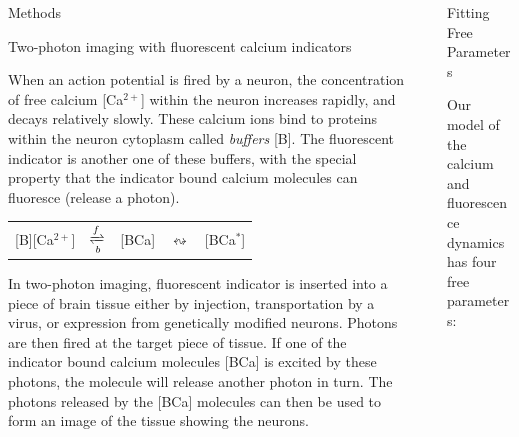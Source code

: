 \documentclass[final]{beamer}
\newlength{\sepwid}
\newlength{\onecolwid}
\begin{document}
\begin{frame}[t]
\begin{columns}[t]
\begin{column}{\onecolwid}
\begin{block}{Methods}
\begin{alertblock}{Two-photon imaging with fluorescent calcium indicators}

When an action potential is fired by a neuron, the concentration of free calcium [Ca$^{2+}$] within the neuron increases rapidly, and decays relatively slowly. These calcium ions bind to proteins within the neuron cytoplasm called \textit{buffers} [B]. The fluorescent indicator is another one of these buffers, with the special property that the indicator bound calcium molecules can fluoresce (release a photon).

\begin{center}
	\begin{tabular}{ccccc}
		[B][Ca$^{2+}$] & $\xrightleftharpoons[b]{f}$ &  [BCa] & $\leftrightsquigarrow$ & [BCa$^*$]
	\end{tabular}
\end{center}

In two-photon imaging, fluorescent indicator is inserted into a piece of brain tissue either by injection, transportation by a virus, or expression from genetically modified neurons. Photons are then fired at the target piece of tissue. If one of the indicator bound calcium molecules [BCa] is excited by these photons, the molecule will release another photon in turn. The photons released by the [BCa] molecules can then be used to form an image of the tissue showing the neurons.
\end{alertblock}


\end{block}

\end{column} %


\begin{column}{\sepwid}\end{column} %

\begin{column}{\onecolwid} %

\begin{block}{Fitting Free Parameters}

Our model of the calcium and fluorescence dynamics has four free parameters:


\end{block}
\end{column}
\end{columns}
\end{frame}
\end{document}
